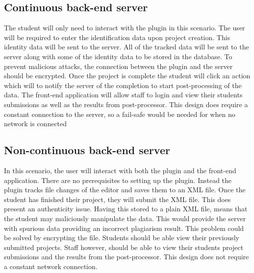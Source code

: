 \subsection{Continuous back-end server}
The student will only need to interact with the plugin in this scenario. The user will be required to enter the identification data upon project creation. This identity data will be sent to the server. All of the tracked data will be sent to the server along with some of the identity data to be stored in the database. To prevent malicious attacks, the connection between the plugin and the server should be encrypted. Once the project is complete the student will click an action which will to notify the server of the completion to start post-processing of the data. The front-end application will allow staff to login and view their students submissions as well as the results from post-processor. This design does require a constant connection to the server, so a fail-safe would be needed for when no network is connected

\subsection{Non-continuous back-end server}
In this scenario, the user will interact with both the plugin and the front-end application. There are no prerequisites to setting up the plugin. Instead the plugin tracks file changes of the editor and saves them to an XML file. Once the student has finished their project, they will submit the XML file. This does present an authenticity issue. Having this stored to a plain XML file, means that the student may maliciously manipulate the data. This would provide the server with spurious data providing an incorrect plagiarism result. This problem could be solved by encrypting the file. Students should be able view their previously submitted projects. Staff however, should be able to view their students project submissions and the results from the post-processor. This design does not require a constant network connection.


